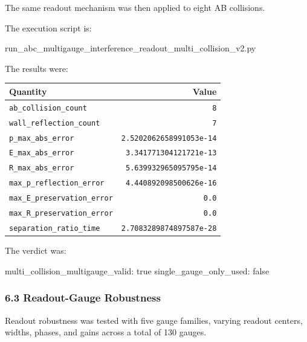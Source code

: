 \documentclass[
  a4paper,
]{article}
\newenvironment{Shaded}{}{}
\newcommand{\NormalTok}[1]{#1}
\newcounter{none} %
\begin{document}
The same readout mechanism was then applied to eight AB collisions.

The execution script is:

\begin{Shaded}
\begin{Highlighting}[]
\NormalTok{run\_abc\_multigauge\_interference\_readout\_multi\_collision\_v2.py}
\end{Highlighting}
\end{Shaded}

The results were:

{\def\LTcaptype{none} %
\begin{longtable}[]{@{}lr@{}}
\toprule\noalign{}
Quantity & Value \\
\midrule\noalign{}
\endhead
\bottomrule\noalign{}
\endlastfoot
\texttt{ab\_collision\_count} & \texttt{8} \\
\texttt{wall\_reflection\_count} & \texttt{7} \\
\texttt{p\_max\_abs\_error} & \texttt{2.5202062658991053e-14} \\
\texttt{E\_max\_abs\_error} & \texttt{3.341771304121721e-13} \\
\texttt{R\_max\_abs\_error} & \texttt{5.639932965095795e-14} \\
\texttt{max\_p\_reflection\_error} & \texttt{4.440892098500626e-16} \\
\texttt{max\_E\_preservation\_error} & \texttt{0.0} \\
\texttt{max\_R\_preservation\_error} & \texttt{0.0} \\
\texttt{separation\_ratio\_time} & \texttt{2.7083289874897587e-28} \\
\end{longtable}
}

The verdict was:

\begin{Shaded}
\begin{Highlighting}[]
\NormalTok{multi\_collision\_multigauge\_valid: true}
\NormalTok{single\_gauge\_only\_used: false}
\end{Highlighting}
\end{Shaded}

\subsubsection{6.3 Readout-Gauge
Robustness}\label{readout-gauge-robustness}

Readout robustness was tested with five gauge families, varying readout
centers, widths, phases, and gains across a total of 130 gauges.
\end{document}
